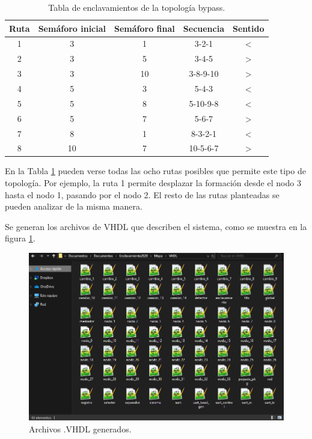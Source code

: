 	\begin{table}[!hbt]
	\caption{Tabla de enclavamientos de la topología bypass.}
	\label{tabla_bypass}
	\centering
	\begin{tabular}{ c  c  c  c  c }
	\hline
	Ruta & Semáforo inicial & Semáforo final & Secuencia & Sentido \\	
	\hline
		1 & 3 & 1 & 3-2-1 & < \\
		2 & 3 & 5 & 3-4-5 & > \\
		3 & 3 & 10 & 3-8-9-10 & > \\
		4 & 5 & 3 & 5-4-3 & < \\
		5 & 5 & 8 & 5-10-9-8 & < \\
		6 & 5 & 7 & 5-6-7 & > \\
		7 & 8 & 1 & 8-3-2-1 & < \\
		8 & 10 & 7 & 10-5-6-7 & > \\
	\end{tabular}
	\end{table}	
	
	En la Tabla \ref{tabla_bypass} pueden verse todas las ocho rutas posibles que permite este tipo de topología. Por ejemplo, la ruta 1 permite desplazar la formación desde el nodo 3 hasta el nodo 1, pasando por el nodo 2. El resto de las rutas planteadas se pueden analizar de la misma manera.
	
	Se generan los archivos de VHDL que describen el sistema, como se muestra en la figura \ref{fig:Bypass_3}.
	
	\begin{figure}[h]
	\centering
	\includegraphics[scale=0.55]{./Figures/Archivos}
		\caption{Archivos .VHDL generados.}
		\label{fig:Bypass_3}
	\end{figure}
	
